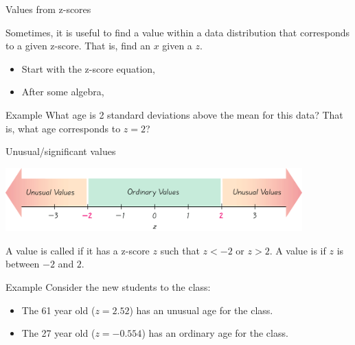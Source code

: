 \documentclass[xcolor=table, aspectratio=169, bigger, handout]{beamer}
\begin{document}
\begin{frame}{Values from z-scores}
\begin{block}{}
Sometimes, it is useful to find a value within a data distribution that corresponds to a given z-score. That is, find an $x$ given a $z$. 
\medskip
\begin{itemize}
\pause\item Start with the z-score equation, \\
\smallskip
{}
\pause\item After some algebra,\\
\smallskip
{}
\end{itemize}
\end{block}

\pause
\begin{exampleblock}{Example}
What age is 2 standard deviations above the mean for this data? That is, what age corresponds to $z=2$?\\
\smallskip
\pause
{}
\end{exampleblock}
\end{frame}

\begin{frame}{Unusual/significant values}

{\centering
\includegraphics[width=4.5in]{../images/ch03_unusual} \par
}

\begin{block}{}
A value is called  if it has a z-score $z$ such that $z< -2$ or $z > 2$. A value is  if $z$ is between $-2$ and $2$.
\end{block}

\pause
\begin{exampleblock}{Example}
Consider the new students to the class:
\begin{itemize}
\item The 61 year old ($z=2.52$) has an unusual age for the class. 
\item The 27 year old ($z=-0.554$) has an ordinary age for the class.
\end{itemize}
\end{exampleblock}
\end{frame}
\end{document}
